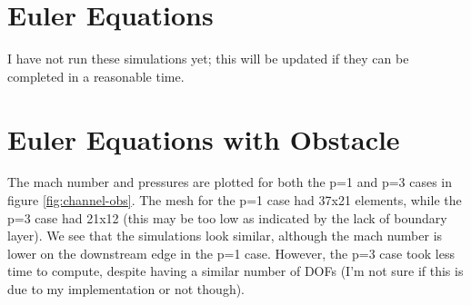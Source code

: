 \documentclass{article}
\begin{document}
\section{Euler Equations}
I have not run these simulations yet; this will be updated if they can be completed in a reasonable time.

\section{Euler Equations with Obstacle}
The mach number and pressures are plotted for both the p=1 and p=3 cases in figure \ref{fig:channel-obs}.
The mesh for the p=1 case had 37x21 elements, while the p=3 case had 21x12 (this may be too low as indicated by the lack of boundary layer).
We see that the simulations look similar, although the mach number is lower on the downstream edge in the p=1 case.
However, the p=3 case took less time to compute, despite having a similar number of DOFs (I'm not sure if this is due to my implementation or not though).
\end{document}
